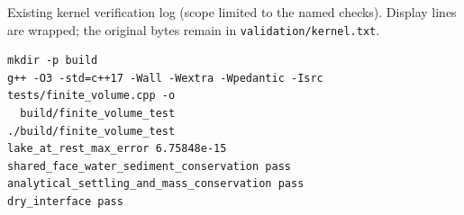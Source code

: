 Existing kernel verification log (scope limited to the named checks). Display lines are wrapped; the original bytes remain in \texttt{validation/kernel.txt}.
\begingroup\scriptsize\begin{verbatim}
mkdir -p build
g++ -O3 -std=c++17 -Wall -Wextra -Wpedantic -Isrc tests/finite_volume.cpp -o
  build/finite_volume_test
./build/finite_volume_test
lake_at_rest_max_error 6.75848e-15
shared_face_water_sediment_conservation pass
analytical_settling_and_mass_conservation pass
dry_interface pass
\end{verbatim}\endgroup
